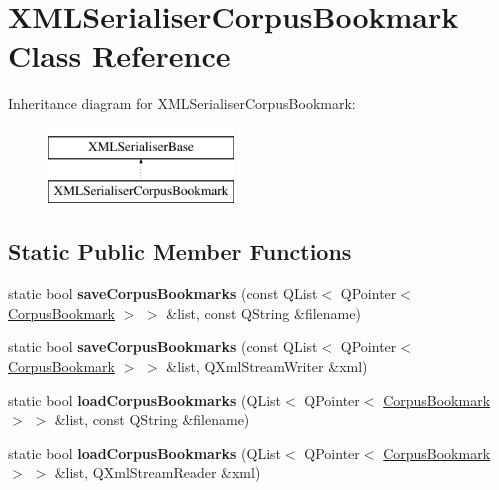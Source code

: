 \hypertarget{class_x_m_l_serialiser_corpus_bookmark}{}\section{X\+M\+L\+Serialiser\+Corpus\+Bookmark Class Reference}
\label{class_x_m_l_serialiser_corpus_bookmark}
Inheritance diagram for X\+M\+L\+Serialiser\+Corpus\+Bookmark\+:\begin{figure}[H]
\begin{center}
\leavevmode
\includegraphics[height=2.000000cm]{class_x_m_l_serialiser_corpus_bookmark}
\end{center}
\end{figure}
\subsection*{Static Public Member Functions}
\begin{DoxyCompactItemize}
\item 
\mbox{\label{class_x_m_l_serialiser_corpus_bookmark_a68a1c8d093016ea8bba43d5bcc9b7c5f}} 
static bool {\bfseries save\+Corpus\+Bookmarks} (const Q\+List$<$ Q\+Pointer$<$ \hyperlink{class_corpus_bookmark}{Corpus\+Bookmark} $>$ $>$ \&list, const Q\+String \&filename)
\item 
\mbox{\label{class_x_m_l_serialiser_corpus_bookmark_a7279eb82b804bf4f1aa7718fcaf92e1e}} 
static bool {\bfseries save\+Corpus\+Bookmarks} (const Q\+List$<$ Q\+Pointer$<$ \hyperlink{class_corpus_bookmark}{Corpus\+Bookmark} $>$ $>$ \&list, Q\+Xml\+Stream\+Writer \&xml)
\item 
\mbox{\label{class_x_m_l_serialiser_corpus_bookmark_ac6cbdec7ab9dc0f0c6c562fba57ceb11}} 
static bool {\bfseries load\+Corpus\+Bookmarks} (Q\+List$<$ Q\+Pointer$<$ \hyperlink{class_corpus_bookmark}{Corpus\+Bookmark} $>$ $>$ \&list, const Q\+String \&filename)
\item 
\mbox{\label{class_x_m_l_serialiser_corpus_bookmark_a6f4b019bc0a06d421fc8e2905f6a2d09}} 
static bool {\bfseries load\+Corpus\+Bookmarks} (Q\+List$<$ Q\+Pointer$<$ \hyperlink{class_corpus_bookmark}{Corpus\+Bookmark} $>$ $>$ \&list, Q\+Xml\+Stream\+Reader \&xml)
\end{DoxyCompactItemize}


